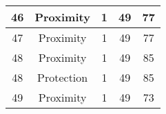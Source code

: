 \documentclass[results.tex]{subfiles}
\begin{document}
\begin{center}
\begin{tabular}{| c || c | c | c | c |}
            \hline
            46                      & Proximity                    & 1                      & 49                      & 77                   \\
            \hline
            47                      & Proximity                    & 1                      & 49                      & 77                   \\
            \hline
            48                      & Proximity                    & 1                      & 49                      & 85                   \\
            \hline
            48                      & Protection                   & 1                      & 49                      & 85                   \\
            \hline
            49                      & Proximity                    & 1                      & 49                      & 73                   \\
            \hline
        \end{tabular}
    \end{center}
\end{document}

